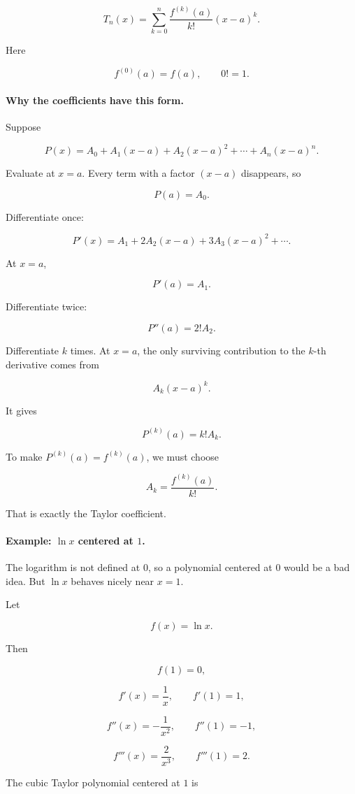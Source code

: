 \[
\boxed{
T_n(x)=
\sum_{k=0}^{n}
\frac{f^{(k)}(a)}{k!}(x-a)^k.
}
\]

Here

\[
f^{(0)}(a)=f(a),
\qquad
0!=1.
\]

\paragraph{Why the coefficients have this form.}
Suppose

\[
P(x)=A_0+A_1(x-a)+A_2(x-a)^2+\cdots+A_n(x-a)^n.
\]

Evaluate at \(x=a\).  Every term with a factor \((x-a)\) disappears, so

\[
P(a)=A_0.
\]

Differentiate once:

\[
P'(x)=A_1+2A_2(x-a)+3A_3(x-a)^2+\cdots.
\]

At \(x=a\),

\[
P'(a)=A_1.
\]

Differentiate twice:

\[
P''(a)=2!A_2.
\]

Differentiate \(k\) times.  At \(x=a\), the only surviving contribution to the \(k\)-th
derivative comes from

\[
A_k(x-a)^k.
\]

It gives

\[
P^{(k)}(a)=k!A_k.
\]

To make \(P^{(k)}(a)=f^{(k)}(a)\), we must choose

\[
A_k=\frac{f^{(k)}(a)}{k!}.
\]

That is exactly the Taylor coefficient.

\paragraph{Example: \(\ln x\) centered at \(1\).}
The logarithm is not defined at \(0\), so a polynomial centered at \(0\) would be a bad
idea.  But \(\ln x\) behaves nicely near \(x=1\).

Let

\[
f(x)=\ln x.
\]

Then

\[
f(1)=0,
\]

\[
f'(x)=\frac1x,
\qquad
f'(1)=1,
\]

\[
f''(x)=-\frac1{x^2},
\qquad
f''(1)=-1,
\]

\[
f'''(x)=\frac2{x^3},
\qquad
f'''(1)=2.
\]

The cubic Taylor polynomial centered at \(1\) is

